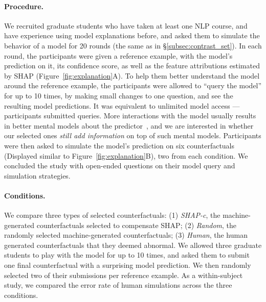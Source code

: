 \paragraph{Procedure.}
We recruited  graduate students who have taken at least one NLP course, and have experience using model explanations before, and asked them to simulate the behavior of a \qqp model for 20 rounds (the same as in \S\ref{subsec:contrast_set}).
In each round, the participants were given a reference example, with the model's prediction on it, its confidence score, as well as the feature attributions estimated by SHAP (Figure~\ref{fig:explanation}A).
To help them better understand the model around the reference example, the participants were allowed to ``query the model'' for up to 10 times, by making small changes to one question, and see the resulting model predictions.
It was equivalent to unlimited model access --- participants submitted  queries.
More interactions with the model usually results in better mental models about the predictor~\cite{miller}, and we are interested in whether our selected ones \emph{still add information} on top of such mental models.
Participants were then asked to simulate the model's prediction on six counterfactuals (Displayed similar to Figure~\ref{fig:explanation}B), two from each condition.
We concluded the study with open-ended questions on their model query and simulation strategies.

\newcommand{\cshap}{\emph{SHAP-c}\xspace}
\newcommand{\crandom}{\emph{Random}\xspace}
\newcommand{\chuman}{\emph{Human}\xspace}

\paragraph{Conditions.} 
We compare three types of selected counterfactuals:
(1) \cshap, the machine-generated counterfactuals selected to compensate SHAP; 
(2) \crandom, the randomly selected machine-generated counterfactuals; 
(3) \chuman, 
the human generated counterfactuals that they deemed abnormal.
We allowed three graduate students to play with the model for up to 10 times, and asked them to submit one final counterfactual with a surprising model prediction.
We then randomly selected two of their submissions per reference example.
As a within-subject study, we compared the error rate of human simulations across the three conditions.


